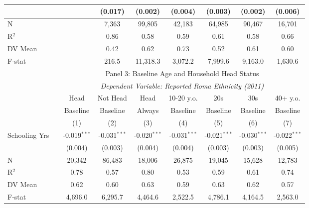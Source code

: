 \begin{tabular}[t]{lcccccccc}
& & & (0.017) & (0.002) & (0.004) & (0.003) & (0.002) & (0.006) \\
\midrule
N & & & 7,363 & 99,805 & 42,183 & 64,985 & 90,467 & 16,701 \\
R$^2$ & & & 0.86 & 0.58 & 0.59 & 0.61 & 0.58 & 0.66 \\
DV Mean & & & 0.42 & 0.62 & 0.73 & 0.52 & 0.61 & 0.60 \\
F-stat & & & 216.5 & 11,318.3 & 3,072.2 & 7,999.6 & 9,163.0 & 1,630.6 \\
\midrule
& & \multicolumn{7}{c}{Panel 3: Baseline Age and Household Head Status}\\
& & \multicolumn{7}{c}{\textit{Dependent Variable: Reported Roma Ethnicity (2011)}}\\
& & Head & Not Head & Head & 10-20 y.o. & 20s & 30s & 40+ y.o.\\
& & Baseline & Baseline & Always & Baseline & Baseline & Baseline & Baseline\\
& & (1) & (2) & (3) & (4) & (5) & (6) & (7) \\
\midrule
Schooling Yrs & & -0.019$^{***}$ & -0.031$^{***}$ & -0.020$^{***}$ & -0.031$^{***}$ & -0.021$^{***}$ & -0.030$^{***}$ & -0.022$^{***}$ \\
& & (0.004) & (0.003) & (0.004) & (0.004) & (0.003) & (0.003) & (0.005) \\
\midrule
N & & 20,342 & 86,483 & 18,006 & 26,875 & 19,045 & 15,628 & 12,783 \\
R$^2$ & & 0.78 & 0.57 & 0.80 & 0.53 & 0.59 & 0.61 & 0.74 \\
DV Mean & & 0.62 & 0.60 & 0.63 & 0.59 & 0.63 & 0.62 & 0.57 \\
F-stat & & 4,696.0 & 6,295.7 & 4,464.6 & 2,522.5 & 4,786.1 & 4,164.5 & 2,563.0 \\
\bottomrule
\end{tabular}
